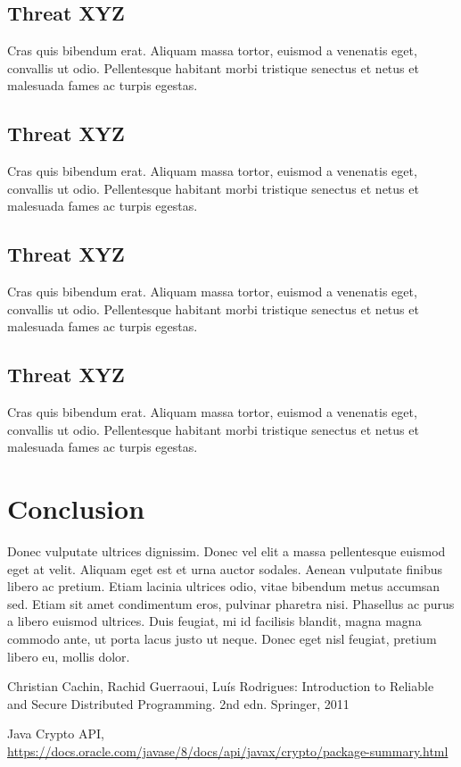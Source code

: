 \documentclass[runningheads]{llncs}
\begin{document}
\subsection{Threat XYZ}
Cras quis bibendum erat. Aliquam massa tortor, euismod a venenatis eget,
convallis ut odio. Pellentesque habitant morbi tristique senectus et netus et
malesuada fames ac turpis egestas.
%
\subsection{Threat XYZ}
Cras quis bibendum erat. Aliquam massa tortor, euismod a venenatis eget,
convallis ut odio. Pellentesque habitant morbi tristique senectus et netus et
malesuada fames ac turpis egestas.
%
\subsection{Threat XYZ}
Cras quis bibendum erat. Aliquam massa tortor, euismod a venenatis eget,
convallis ut odio. Pellentesque habitant morbi tristique senectus et netus et
malesuada fames ac turpis egestas.
%
\subsection{Threat XYZ}
Cras quis bibendum erat. Aliquam massa tortor, euismod a venenatis eget,
convallis ut odio. Pellentesque habitant morbi tristique senectus et netus et
malesuada fames ac turpis egestas.
%
\section{Conclusion}
Donec vulputate ultrices dignissim. Donec vel elit a massa pellentesque euismod
eget at velit. Aliquam eget est et urna auctor sodales. Aenean vulputate finibus
libero ac pretium. Etiam lacinia ultrices odio, vitae bibendum metus accumsan
sed. Etiam sit amet condimentum eros, pulvinar pharetra nisi. Phasellus ac purus
a libero euismod ultrices. Duis feugiat, mi id facilisis blandit, magna magna
commodo ante, ut porta lacus justo ut neque. Donec eget nisl feugiat, pretium
libero eu, mollis dolor.

\begin{thebibliography}{8}

Christian Cachin, Rachid Guerraoui, Luís Rodrigues: Introduction to Reliable and
Secure Distributed Programming. 2nd edn. Springer, 2011

Java Crypto API,
\url{https://docs.oracle.com/javase/8/docs/api/javax/crypto/package-summary.html}
\end{thebibliography}
\end{document}
